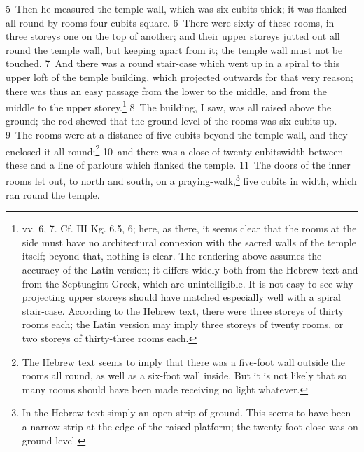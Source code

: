 \documentclass[10pt]{book} %
\begin{document}
\textcolor{benred8}{5}~Then he measured the temple wall, which was six cubits thick; it was flanked all round by rooms four cubits square. \textcolor{benred8}{6}~There were sixty of these rooms, in three storeys one on the top of another; and their upper storeys jutted out all round the temple wall, but keeping apart from it; the temple wall must not be touched. \textcolor{benred8}{7}~And there was a round stair-case which went up in a spiral to this upper loft of the temple building, which projected outwards for that very reason; there was thus an easy passage from the lower to the middle, and from the middle to the upper storey.\footnote[2]{vv. 6, 7. Cf. III Kg. 6.5, 6; here, as there, it seems clear that the rooms at the side must have no architectural connexion with the sacred walls of the temple itself; beyond that, nothing is clear. The rendering above assumes the accuracy of the Latin version; it differs widely both from the Hebrew text and from the Septuagint Greek, which are unintelligible. It is not easy to see why projecting upper storeys should have matched especially well with a spiral stair-case. According to the Hebrew text, there were three storeys of thirty rooms each; the Latin version may imply three storeys of twenty rooms, or two storeys of thirty-three rooms each.} \textcolor{benred8}{8}~The building, I saw, was all raised above the ground; the rod shewed that the ground level of the rooms was six cubits up. \textcolor{benred8}{9}~The rooms were at a distance of five cubits beyond the temple wall, and they enclosed it all round;\footnote[3]{The Hebrew text seems to imply that there was a five-foot wall outside the rooms all round, as well as a six-foot wall inside. But it is not likely that so many rooms should have been made receiving no light whatever.} \textcolor{benred8}{10}~and there was a close of twenty cubits\textquotesingle  width between these and a line of parlours which flanked the temple. \textcolor{benred8}{11}~The doors of the inner rooms let out, to north and south, on a praying-walk,\footnote[4]{In the Hebrew text simply \textasciigrave an open strip of ground\textquotesingle . This seems to have been a narrow strip at the edge of the raised platform; the twenty-foot close was on ground level.} five cubits in width, which ran round the temple.
\end{document}
